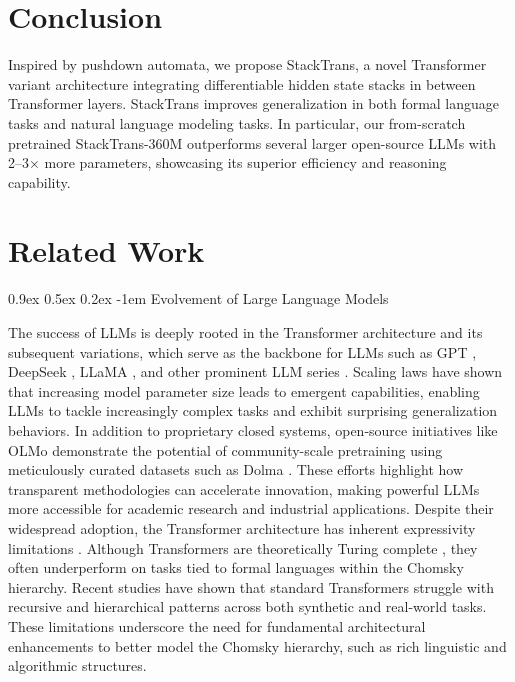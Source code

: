 \documentclass{article}
\makeatletter
\providecommand{\paragraph}{}
\renewcommand{\paragraph}[1]{%
  \@startsection{paragraph}{4}{\z@}%
                {0.9ex \@plus 0.5ex \@minus 0.2ex}%
                {-1em}%
                {\normalsize\bfseries}%
  {#1}
}
\DeclareRobustCommand{\method}{{\sc StackTrans}\xspace}
\makeatother
\begin{document}
\section{Conclusion}

Inspired by pushdown automata, we propose \method, a novel Transformer variant architecture integrating differentiable hidden state stacks in between Transformer layers.
\method improves generalization in both formal language tasks and natural language modeling tasks. 
In particular, our from-scratch pretrained \method-360M outperforms several larger open-source LLMs with 2–3$\times$ more parameters, showcasing its superior efficiency and reasoning capability. 








\appendix




\section{Related Work}
\label{appendix:related}

\paragraph{Evolvement of Large Language Models}
The success of LLMs is deeply rooted in the Transformer architecture \citep{vaswani2017attention} and its subsequent variations, which serve as the backbone for LLMs such as GPT \citep{radford2018improving, GPT-4, GPT-4o}, DeepSeek \citep{bi2024deepseek, liu2024deepseek}, LLaMA \citep{touvron2023llama}, and other prominent LLM series \citep{brown2020language}.
Scaling laws \citep{kaplan2020scaling} have shown that increasing model parameter size leads to emergent capabilities, enabling LLMs to tackle increasingly complex tasks and exhibit surprising generalization behaviors.
In addition to proprietary closed systems, open-source initiatives like OLMo \citep{groeneveld2024olmo} demonstrate the potential of community-scale pretraining using meticulously curated datasets such as Dolma \citep{soldaini2024dolma}. These efforts highlight how transparent methodologies can accelerate innovation, making powerful LLMs more accessible for academic research and industrial applications.
Despite their widespread adoption, the Transformer architecture has inherent expressivity limitations \citep{hahn2020theoretical}.
Although Transformers are theoretically Turing complete \citep{chomsky1956three}, they often underperform on tasks tied to formal languages within the Chomsky hierarchy.
Recent studies \citep{deletang2022neural, dusell2024stack} have shown that standard Transformers struggle with recursive and hierarchical patterns across both synthetic and real-world tasks. 
These limitations underscore the need for fundamental architectural enhancements to better model the Chomsky hierarchy, such as rich linguistic and algorithmic structures.
\end{document}
